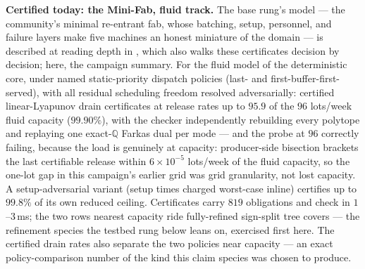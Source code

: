 \textbf{Certified today: the Mini-Fab, fluid track.} The base rung's model --- the
community's minimal re-entrant fab, whose batching, setup, personnel,
and failure layers make five machines an honest miniature of the
domain --- is described at reading depth in
, which
also walks these certificates decision by decision; here, the
campaign summary. For the fluid model of the deterministic core,
under named static-priority dispatch policies (last- and
first-buffer-first-served), with all residual scheduling freedom
resolved adversarially: certified linear-Lyapunov drain certificates
at release rates up to $95.9$ of the $96$ lots/week fluid capacity
($99.90\%$), with the checker independently rebuilding every polytope
and replaying one exact-$\mathbb{Q}$ Farkas dual per mode --- and the
probe at $96$ correctly failing, because the load is genuinely at
capacity: producer-side bisection brackets the last certifiable
release within $6 \times 10^{-5}$ lots/week of the fluid capacity, so
the one-lot gap in this campaign's earlier grid was grid granularity,
not lost capacity. A setup-adversarial variant (setup times charged
worst-case inline) certifies up to $99.8\%$ of its own reduced
ceiling. Certificates carry $819$ obligations and check in
$1$--$3$\,ms; the two rows nearest capacity ride fully-refined
sign-split tree covers --- the refinement species the testbed rung
below leans on, exercised first here. The certified drain rates also
separate the two policies near capacity --- an exact
policy-comparison number of the kind this claim species was chosen to
produce.

